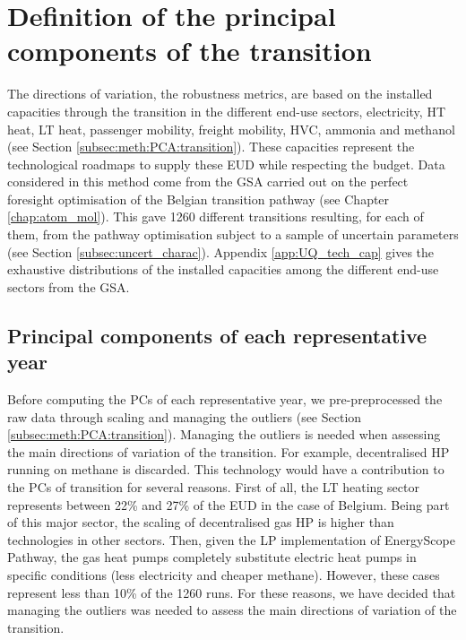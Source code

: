 \section{Definition of the principal components of the transition}
\label{sec:RobPol:PC_transition}
The directions of variation, \ie the robustness metrics, are based on the installed capacities through the transition in the different end-use sectors, \ie electricity, \gls{HT} heat, \gls{LT} heat, passenger mobility, freight mobility, \gls{HVC}, ammonia and methanol (see Section \ref{subsec:meth:PCA:transition}). These capacities represent the technological roadmaps to supply these \gls{EUD} while respecting the  budget.  Data considered in this method come from the \gls{GSA} carried out on the perfect foresight optimisation of the Belgian transition pathway (see Chapter \ref{chap:atom_mol}). This gave 1260 different transitions resulting, for each of them, from the pathway optimisation subject to a sample of uncertain parameters (see Section \ref{subsec:uncert_charac}). Appendix \ref{app:UQ_tech_cap} gives the exhaustive distributions of the installed capacities among the different end-use sectors from the \gls{GSA}.

\subsection{Principal components of each representative year}
\label{subsec:RobPol:PC_year}
Before computing the \gls{PCs} of each representative year, we pre-preprocessed the raw data through scaling and managing the outliers (see Section \ref{subsec:meth:PCA:transition}). Managing the outliers is needed when assessing the main directions of variation of the transition. For example, decentralised \gls{HP} running on methane is discarded. This technology would have a contribution to the \gls{PCs} of transition for several reasons. First of all, the \gls{LT} heating sector represents between 22\% and 27\% of the \gls{EUD} in the case of Belgium. Being part of this major sector, the scaling of decentralised gas \gls{HP} is higher than technologies in other sectors. Then, given the \gls{LP} implementation of EnergyScope Pathway, the gas heat pumps completely substitute electric heat pumps in specific conditions (less electricity and cheaper methane). However, these cases represent less than 10\% of the 1260 runs. For these reasons, we have decided that managing the outliers was needed to assess the main directions of variation of the transition.

